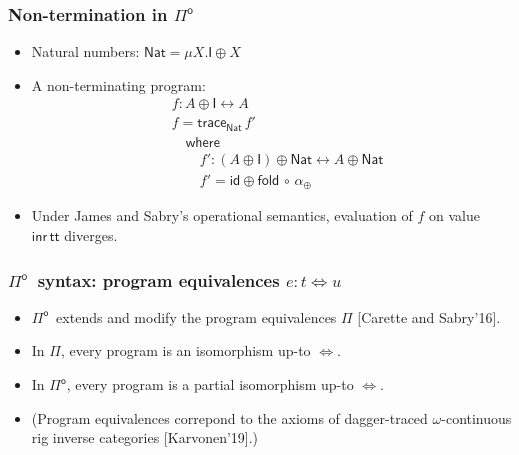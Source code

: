 \documentclass[12pt,t]{beamer}
\newcommand{\Nat}{\mathsf{Nat}}
\newcommand{\Pio}{\ensuremath{\mathsf{\Pi}^{\mathsf{o}}}}
\newcommand{\inr}{\mathsf{inr}}
\newcommand{\id}{\mathsf{id}}
\newcommand{\lr}{\longleftrightarrow}
\newcommand{\fold}{\mathsf{fold}}
\newcommand{\unfold}{\mathsf{unfold}}
\newcommand{\trace}{\ensuremath{\mathsf{trace}}}
\newcommand{\Z}{\mathsf{Z}}
\newcommand{\I}{\mathsf{I}}
\newcommand{\LR}{\iff}
\renewcommand{\dagger}{\mathsf{dagger}}
\begin{document}
\begin{frame}
  \frametitle{Non-termination in \Pio}
  \begin{itemize}
  \item Natural numbers: $\Nat = \mu X. \I \oplus X$
  \item A non-terminating program:
    \begin{align*}
      & f : A \oplus \I \lr A \\
      & f = \trace_\Nat\,f' \\
      & \quad \mathsf{where} \\
      & \quad \quad  f' : (A \oplus \I) \oplus \Nat \lr A \oplus \Nat \\
      & \quad \quad f' = \id \oplus \fold \, \circ \, \alpha_{\oplus}
    \end{align*}
    \item Under James and Sabry's operational semantics, evaluation of
      $f$ on value $\inr\,\mathsf{tt}$ diverges.
  \end{itemize}
  
\end{frame}

\begin{frame}
  \frametitle{\Pio\ syntax: program equivalences $e : t \LR u$}
  \begin{itemize}
  \item \Pio\ extends and modify the program equivalences $\Pi$ [Carette and Sabry'16].
  \item In $\Pi$, every program is an isomorphism up-to ${\LR}$.
  \item In \Pio, every program is a partial isomorphism up-to ${\LR}$.


    \vspace{\fill}
  \item (Program equivalences correpond to the axioms of
    dagger-traced $\omega$-continuous rig inverse categories [Karvonen'19].)
    \end{itemize}
\end{frame}
\end{document}
